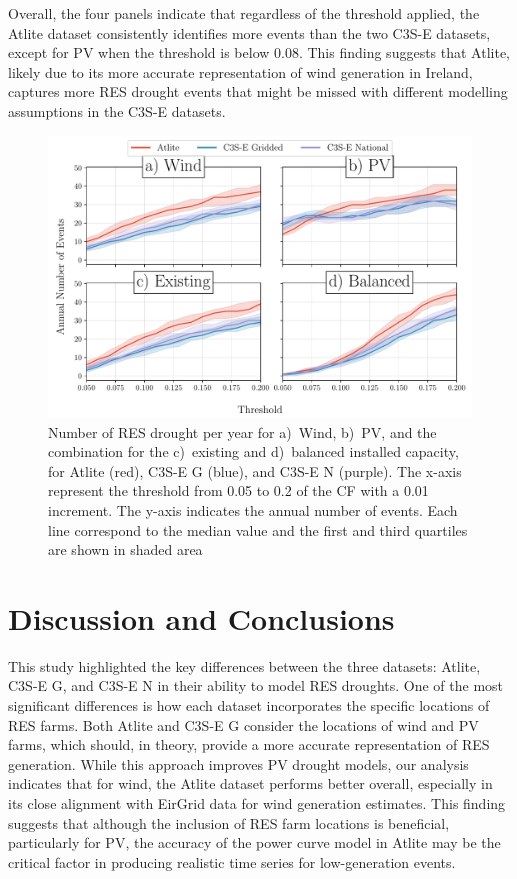 \documentclass[a4paper, 11pt]{article}
\begin{document}
Overall, the four panels indicate that regardless of the threshold applied, the Atlite dataset consistently identifies more events than the two C3S-E datasets, except for PV when the threshold is below 0.08. This finding suggests that Atlite, likely due to its more accurate representation of wind generation in Ireland, captures more RES drought events that might be missed with different modelling assumptions in the C3S-E datasets.

\begin{figure}[!ht]
	\centering
	\includegraphics[width=\textwidth]{droughts_varying_threshold}
	\caption{Number of RES drought per year for a)~Wind, b)~PV, and the combination for the c)~existing and d)~balanced installed capacity, for Atlite (red), C3S-E G (blue), and C3S-E N (purple). The x-axis represent the threshold from 0.05 to 0.2 of the CF with a 0.01 increment. The y-axis indicates the annual number of events. Each line correspond to the median value and the first and third quartiles are shown in shaded area}
	\label{fig:number_days_threshold}
\end{figure}

\newpage
\section{Discussion and Conclusions}
\label{sec:Conclusion}

This study highlighted the key differences between the three datasets: Atlite, C3S-E G, and C3S-E N in their ability to model RES droughts. One of the most significant differences is how each dataset incorporates the specific locations of RES farms. Both Atlite and C3S-E G consider the locations of wind and PV farms, which should, in theory, provide a more accurate representation of RES generation. While this approach improves PV drought models, our analysis indicates that for wind, the Atlite dataset performs better overall, especially in its close alignment with EirGrid data for wind generation estimates. This finding suggests that although the inclusion of RES farm locations is beneficial, particularly for PV, the accuracy of the power curve model in Atlite may be the critical factor in producing realistic time series for low-generation events.
\end{document}
